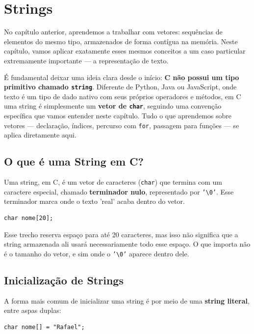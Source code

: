 \chapter{Strings}
No capítulo anterior, aprendemos a trabalhar com vetores: sequências de elementos do mesmo tipo, armazenados de forma contígua na memória. Neste capítulo, vamos aplicar exatamente esses mesmos conceitos a um caso particular extremamente importante — a representação de texto.

É fundamental deixar uma ideia clara desde o início: \textbf{C não possui um tipo primitivo chamado \texttt{string}}. Diferente de Python, Java ou JavaScript, onde texto é um tipo de dado nativo com seus próprios operadores e métodos, em C uma string é simplesmente um \textbf{vetor de \texttt{char}}, seguindo uma convenção específica que vamos entender neste capítulo. Tudo o que aprendemos sobre vetores — declaração, índices, percurso com \texttt{for}, passagem para funções — se aplica diretamente aqui.

\section{O que é uma String em C?}
\label{sec:string-conceito}

Uma string, em C, é um vetor de caracteres (\texttt{char}) que termina com um caractere especial, chamado \textbf{terminador nulo}, representado por \texttt{'\textbackslash 0'}. Esse terminador marca onde o texto 'real' acaba dentro do vetor.

\begin{lstlisting}
char nome[20];
\end{lstlisting}

Esse trecho reserva espaço para até 20 caracteres, mas isso não significa que a string armazenada ali usará necessariamente todo esse espaço. O que importa não é o tamanho do vetor, e sim onde o \texttt{'\textbackslash 0'} aparece dentro dele.

\section{Inicialização de Strings}

A forma mais comum de inicializar uma string é por meio de uma \textbf{string literal}, entre aspas duplas:

\begin{lstlisting}
char nome[] = "Rafael";
\end{lstlisting}

